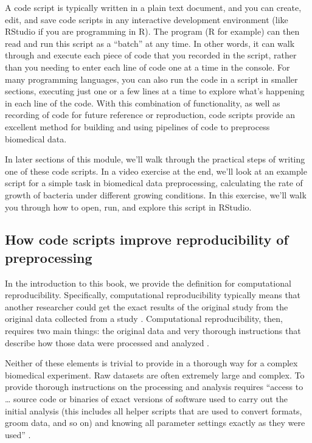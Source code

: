 \documentclass[]{tufte-book}
\begin{document}
A code script is typically written in a plain text document, and you can create,
edit, and save code scripts in any interactive development environment (like
RStudio if you are programming in R). The program (R for example) can then read
and run this script as a ``batch'' at any time. In other words, it can walk
through and execute each piece of code that you recorded in the script, rather
than you needing to enter each line of code one at a time in the console. For
many programming languages, you can also run the code in a script in smaller
sections, executing just one or a few lines at a time to explore what's
happening in each line of the code. With this combination of functionality, as
well as recording of code for future reference or reproduction, code scripts
provide an excellent method for building and using pipelines of code to
preprocess biomedical data.

In later sections of this module, we'll walk through the practical steps of
writing one of these code scripts. In a video exercise at the end, we'll look at
an example script for a simple task in biomedical data preprocessing,
calculating the rate of growth of bacteria under different growing conditions.
In this exercise, we'll walk you through how to open, run, and explore this
script in RStudio.

\subsection{How code scripts improve reproducibility of preprocessing}\label{how-code-scripts-improve-reproducibility-of-preprocessing}

In the introduction to this book, we provide the definition for computational
reproducibility. Specifically, computational reproducibility typically means
that another researcher could get the exact results of the original study from
the original data collected from a study \citep{stark2018before}. Computational
reproducibility, then, requires two main things: the original data and very
thorough instructions that describe how those data were processed and analyzed
\citep{nekrutenko2012next}.

Neither of these elements is trivial to provide in a thorough way for a complex
biomedical experiment. Raw datasets are often extremely large and complex. To
provide thorough instructions on the processing and analysis requires ``access to
\ldots{} source code or binaries of exact versions of software used to carry out the
initial analysis (this includes all helper scripts that are used to convert
formats, groom data, and so on) and knowing all parameter settings exactly as
they were used'' \citep{nekrutenko2012next}.
\end{document}
